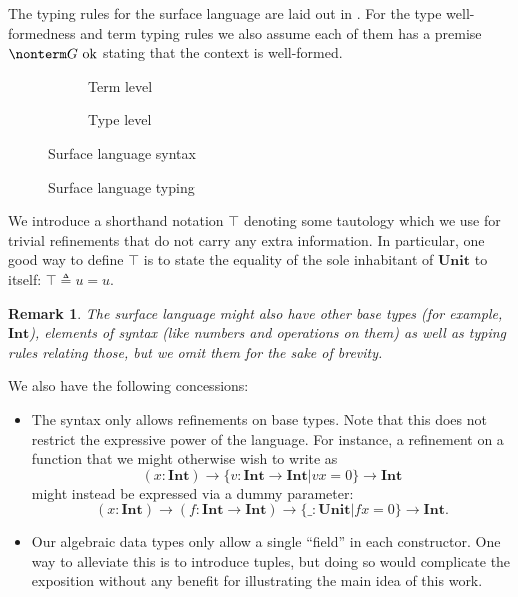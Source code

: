 \documentclass[a4paper]{article}
\newtheorem{remark}{Remark}
\newcommand{\unit}{u}
\newcommand{\Unit}{\textbf{Unit}}
\newcommand{\Int}{\textbf{Int}}
\newcommand{\ctxok}{\text{~ok}}
\begin{document}
The typing rules for the surface language are laid out in .
For the type well-formedness and term typing rules
we also assume each of them has a premise $\nonterm G \ctxok$
stating that the context is well-formed.

\begin{figure}[ht]
  \footnotesize
  \begin{subfigure}{.6\textwidth}
    \caption{Term level}
  \end{subfigure}
  \begin{subfigure}{.5\textwidth}
    \caption{Type level}
  \end{subfigure}
  \caption{Surface language syntax}
  \label{fig:surface_syntax}
\end{figure}

\begin{figure}[ht]
  \footnotesize
  \drules[TCTX]{$\nonterm G \ctxok$}{context well-formedness}{Empty,Bind}
  \caption{Surface language typing}
  \label{fig:surface_typing}
\end{figure}

We introduce a shorthand notation $\top$ denoting some tautology
which we use for trivial refinements that do not carry any extra information.
In particular, one good way to define $\top$ is
to state the equality of the sole inhabitant of $\Unit$ to itself:
$\top \triangleq \unit = \unit$.

\begin{remark}\label{remark:surface_base_types}
  The surface language might also have other base types (for example, $\Int$),
  elements of syntax (like numbers and operations on them)
  as well as typing rules relating those,
  but we omit them for the sake of brevity.
\end{remark}

We also have the following concessions:
\begin{itemize}
  \item The syntax only allows refinements on base types.
    Note that this does not restrict the expressive power of the language.
    For instance, a refinement on a function that we might otherwise wish to write as
    \[
      (x : \Int) \rightarrow \{ v : \Int \rightarrow \Int | v x = 0 \} \rightarrow \Int
    \]
    might instead be expressed via a dummy parameter:
    \[
      (x : \Int) \rightarrow (f : \Int \rightarrow \Int) \rightarrow \{ \_ : \Unit | f x = 0 \} \rightarrow \Int.
    \]
  \item Our algebraic data types only allow a single ``field'' in each constructor.
    One way to alleviate this is to introduce tuples,
    but doing so would complicate the exposition
    without any benefit for illustrating the main idea of this work.
\end{itemize}
\end{document}
